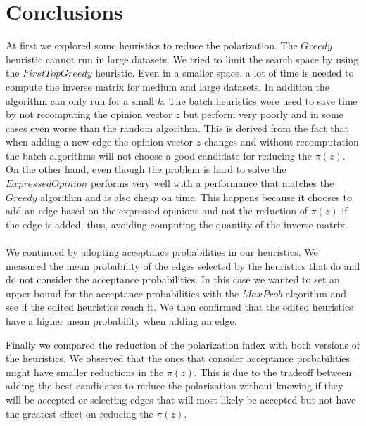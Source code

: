 \chapter{Conclusions}
\label{ch:conclusions}


At first we explored some heuristics to reduce the polarization. The $Greedy$ heuristic cannot run in large datasets. We tried to limit the search space by using the $FirstTopGreedy$ heuristic. Even in a smaller space, a lot of time is needed to compute the inverse matrix for medium and large datasets. In addition the algorithm can only run for a small $k$. The batch heuristics were used to save time by not recomputing the opinion vector $z$ but perform very poorly and in some cases even worse than the random algorithm. This is derived from the fact that when adding a new edge the opinion vector $z$ changes and without recomputation the batch algorithms will not choose a good candidate for reducing the $\pi(z)$. On the other hand, even though the problem is hard to solve the $ExpressedOpinion$ performs very well with a performance that matches the $Greedy$ algorithm and is also cheap on time. This happens because it chooses to add an edge based on the expressed opinions and not the reduction of $\pi(z)$ if the edge is added, thus, avoiding computing the quantity of the inverse matrix.
\\
\\
We continued by adopting acceptance probabilities in our heuristics. We measured the mean probability of the edges selected by the heuristics that do and do not consider the acceptance probabilities. In this case we wanted to set an upper bound for the acceptance probabilities with the $MaxProb$ algorithm and see if the edited heuristics reach it. We then confirmed that the edited heuristics have a higher mean probability when adding an edge. 

\clearpage

\noindent Finally we compared the reduction of the polarization index with both versions of the heuristics. We observed that the ones that consider acceptance probabilities might have smaller reductions in the $\pi(z)$. This is due to the tradeoff between adding the best candidates to reduce the polarization without knowing if they will be accepted or selecting edges that will most likely be accepted but not have the greatest effect on reducing the $\pi(z)$.





